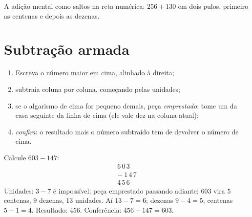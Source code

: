 \begin{omfigure}

{\small A adição mental como saltos na reta numérica: $256 + 130$ em
dois pulos, primeiro as centenas e depois as dezenas.}
\end{omfigure}

\section{Subtração armada}

\begin{method}\label{met:g3:addsub:sub}
\begin{enumerate}
  \item Escreva o número maior em cima, alinhado à direita;
  \item subtraia coluna por coluna, começando pelas unidades;
  \item se o algarismo de cima for pequeno demais, peça
        \emph{emprestado}: tome um da casa seguinte da linha de cima
        (ele vale dez na coluna atual);
  \item \emph{confira}: o resultado mais o número subtraído tem de
        devolver o número de cima.
\end{enumerate}
\end{method}

\begin{example}\label{ex:g3:addsub:sub}
Calcule $603 - 147$:
\[
\begin{array}{r}
6\,0\,3 \\
-\ 1\,4\,7 \\
\hline
4\,5\,6
\end{array}
\]
Unidades: $3 - 7$ é impossível; peça emprestado passando adiante:
$603$ vira $5$ centenas, $9$ dezenas, $13$ unidades. Aí
$13 - 7 = 6$; dezenas $9 - 4 = 5$; centenas $5 - 1 = 4$. Resultado:
$456$. Conferência: $456 + 147 = 603$.
\end{example}

